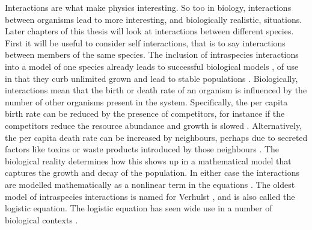 Interactions are what make physics interesting. 
So too in biology, interactions between organisms lead to more interesting, and biologically realistic, situations. 
Later chapters of this thesis will look at interactions between different species. 
First it will be useful to consider self interactions, that is to say interactions between members of the same species. 
The inclusion of intraspecies interactions into a model of one species already leads to successful biological models \cite{Verhulst1838,Ovaskainen2010,Newman2004,Allen2005,Assaf2009,Greenhalgh1990,Hubbell2001,Adler2010,Kessler2007,Brock2006,Norden1982,Dushoff2000}, of use in that they curb unlimited grown and lead to stable populations \cite{Verhulst1838,Ovaskainen2010}. 
Biologically, interactions mean that the birth or death rate of an organism is influenced by the number of other organisms present in the system. 
Specifically, the per capita birth rate can be reduced by the presence of competitors, for instance if the competitors reduce the resource abundance and growth is slowed \cite{Nadell2008,Vulic2001}. 
Alternatively, the per capita death rate can be increased by neighbours, perhaps due to secreted factors like toxins or waste products introduced by those neighbours \cite{Greenhalgh1990,VanMelderen2009,Rankin2012}. 
The biological reality determines how this shows up in a mathematical model that captures the growth and decay of the population. 
In either case the interactions are modelled mathematically as a nonlinear term in the equations \cite{Greenhalgh1990,Ovaskainen2010,Assaf2010,Allen2003a,Norden1982,Newman2004,Allen2005,Nasell2001}. %
%
The oldest model of intraspecies interactions is named for Verhulst \cite{Verhulst1838}, and is also called the logistic equation. 
The logistic equation has seen wide use in a number of biological contexts \cite{Ovaskainen2010,Newman2004,Allen2005,Assaf2009,Greenhalgh1990,Hubbell2001,Adler2010,Kessler2007,Brock2006,Norden1982,Dushoff2000}. %

